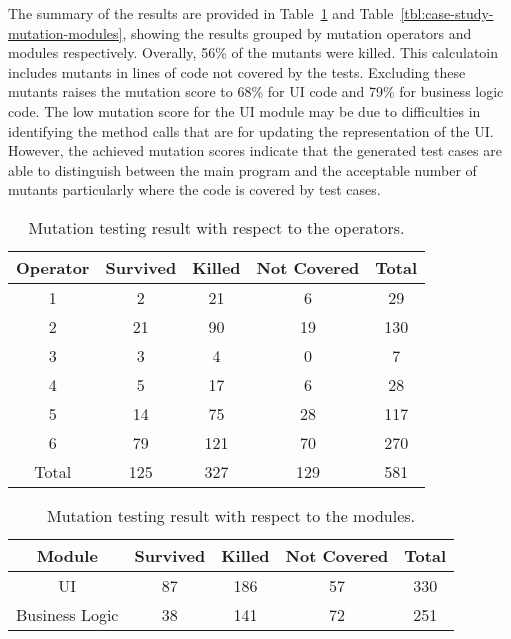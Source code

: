 The summary of the results are provided in Table~\ref{tbl:case-study-mutation-operators} and Table~\ref{tbl:case-study-mutation-modules}, showing the results grouped by mutation operators and modules respectively. Overally, 56\% of the mutants were killed. This calculatoin includes mutants in lines of code not covered by the tests. Excluding these mutants raises the mutation score to 68\% for UI code and 79\% for business logic code. The low mutation score for the UI module may be due to difficulties in identifying the method calls that are for updating the representation of the UI. 
However, the achieved mutation scores indicate that the generated test cases are able to distinguish between the main program and the acceptable number of mutants particularly where the code is covered by test cases.

\begin{table}[!t]
\caption{Mutation testing result with respect to the operators.}
\label{tbl:case-study-mutation-operators}
\centering
\begin{tabular}{|c|c|c|c|c|}
\hline
Operator & Survived & Killed & Not Covered & Total \\ \hline
1 & 2 & 21 & 6 & 29 \\ \hline
2 & 21 & 90 & 19 & 130  \\ \hline
3 & 3 & 4 & 0 & 7 \\ \hline
4 & 5 & 17 & 6 & 28 \\ \hline
5 & 14 & 75 & 28 & 117 \\ \hline
6 & 79 & 121 & 70 & 270 \\ \hline\hline
Total & 125 & 327 & 129 & 581 \\
\hline
\end{tabular}
\end{table}

\begin{table}[!t]
\caption{Mutation testing result with respect to the modules.}
\label{tbl:case-study-mutation-module}
\centering
\begin{tabular}{|c|c|c|c|c|}
\hline
Module & Survived & Killed & Not Covered & Total \\ \hline
UI & 87 & 186 & 57 & 330 \\ \hline
Business Logic & 38 & 141 & 72 & 251 \\
\hline
\end{tabular}
\end{table}

